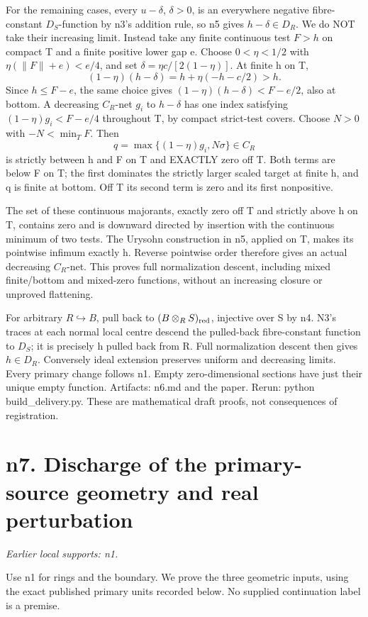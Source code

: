 \documentclass[11pt]{article}
\begin{document}
For the remaining cases, every \(u-\delta\), \(\delta>0\), is an everywhere negative fibre-constant \(D_S\)-function by n3's addition rule, so n5 gives \(h-\delta\in D_R\). We do NOT take their increasing limit. Instead take any finite continuous test \(F>h\) on compact T and a finite positive lower gap e. Choose \(0<\eta<1/2\) with \(\eta(\|F\|+e)<e/4\), and set \(\delta=\eta c/[2(1-\eta)]\). At finite h on T,
\[
(1-\eta)(h-\delta)=h+\eta(-h-c/2)>h.
\]
Since \(h\le F-e\), the same choice gives \((1-\eta)(h-\delta)<F-e/2\), also at bottom. A decreasing \(C_R\)-net \(g_i\) to \(h-\delta\) has one index satisfying \((1-\eta)g_i<F-e/4\) throughout T, by compact strict-test covers. Choose \(N>0\) with \(-N<\min_T F\). Then
\[
q=\max\{(1-\eta)g_i,N\sigma\}\in C_R
\]
is strictly between h and F on T and EXACTLY zero off T. Both terms are below F on T; the first dominates the strictly larger scaled target at finite h, and q is finite at bottom. Off T its second term is zero and its first nonpositive.

The set of these continuous majorants, exactly zero off T and strictly above h on T, contains zero and is downward directed by insertion with the continuous minimum of two tests. The Urysohn construction in n5, applied on T, makes its pointwise infimum exactly h. Reverse pointwise order therefore gives an actual decreasing \(C_R\)-net. This proves full normalization descent, including mixed finite/bottom and mixed-zero functions, without an increasing closure or unproved flattening.

For arbitrary \(R\hookrightarrow B\), pull back to \((B\otimes_R S)_{\rm red}\), injective over S by n4. N3's traces at each normal local centre descend the pulled-back fibre-constant function to \(D_S\); it is precisely h pulled back from R. Full normalization descent then gives \(h\in D_R\). Conversely ideal extension preserves uniform and decreasing limits. Every primary change follows n1. Empty zero-dimensional sections have just their unique empty function. Artifacts: n6.md and the paper. Rerun: python build\_delivery.py. These are mathematical draft proofs, not consequences of registration.

\section{n7. Discharge of the primary-source geometry and real perturbation}
\textit{Earlier local supports: n1.}

Use n1 for rings and the boundary. We prove the three geometric inputs, using the exact published primary units recorded below. No supplied continuation label is a premise.
\end{document}
